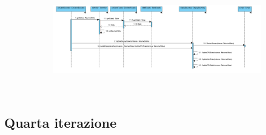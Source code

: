 \documentclass[11pt]{article}
\begin{document}
\begin{figure}[!h]
\vspace*{-4cm}

\centering
	\begin{subfigure}{600px}
	\hspace*{-3cm}
	\includegraphics[width=550px, height=180px]{SQD_UpdateDisplayBoundary.png}\\
	\end{subfigure}
\end{figure}
\clearpage



\clearpage
\subsection{Quarta iterazione}
\end{document}
